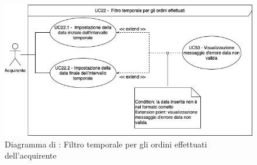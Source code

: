 \label{filtro-temporale-ordini-acquirente}

\begin{figure}[H]
    \centering
    \includegraphics[scale=0.5]{Immagini/DiagrammiUC/Acquirente/FiltroTemporaleAcquirente.png}
    \caption{Diagramma di \actualUC: Filtro temporale per gli ordini effettuati dell'acquirente}
    \label{fig:filtro-temporale-ordini-acquirente}
\end{figure}

